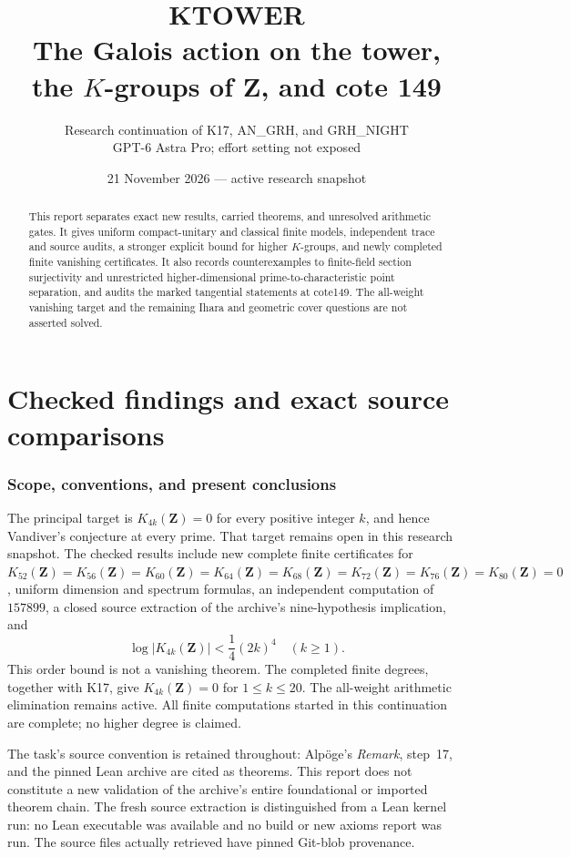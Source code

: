 \documentclass[11pt,a4paper]{article}
\title{KTOWER\\The Galois action on the tower,\\the $K$-groups of $\mathbf Z$, and cote 149}
\author{Research continuation of K17, AN\_GRH, and GRH\_NIGHT\\GPT-6 Astra Pro; effort setting not exposed}
\date{21 November 2026 --- active research snapshot}
\theoremstyle{definition}
\begin{document}
\maketitle
\begin{abstract}
This report separates exact new results, carried theorems, and unresolved
arithmetic gates. It gives uniform compact-unitary and classical finite
models, independent trace and source audits, a stronger explicit bound
for higher $K$-groups, and newly completed finite vanishing certificates.
It also records counterexamples to finite-field section surjectivity
and unrestricted higher-dimensional prime-to-characteristic point
separation, and audits the marked tangential statements at cote149.
The all-weight vanishing target and the remaining Ihara and geometric
cover questions are not asserted solved.
\end{abstract}
\tableofcontents
\clearpage

\part{Checked findings and exact source comparisons}

\section{Scope, conventions, and present conclusions}

The principal target is $K_{4k}(\mathbf Z)=0$ for every positive
integer $k$, and hence Vandiver's conjecture at every prime.
That target remains open in this research snapshot.
The checked results include new complete finite certificates for
$K_{52}(\mathbf Z)=K_{56}(\mathbf Z)=K_{60}(\mathbf Z)=K_{64}(\mathbf Z)=K_{68}(\mathbf Z)=K_{72}(\mathbf Z)=K_{76}(\mathbf Z)=K_{80}(\mathbf Z)=0$, uniform dimension and
spectrum formulas, an independent computation of $157899$, a closed
source extraction of the archive's nine-hypothesis implication, and
\[
 \boxed{\ \log|K_{4k}(\mathbf Z)|<\frac14(2k)^4\quad(k\ge1).\ }
\]
This order bound is not a vanishing theorem. The completed finite
degrees, together with K17, give $K_{4k}(\mathbf Z)=0$ for
$1\le k\le20$. The all-weight arithmetic elimination remains
active. All finite computations started in this continuation are complete;
no higher degree is claimed.

The task's source convention is retained throughout: Alp\"oge's
\emph{Remark}, step~17, and the pinned Lean archive are cited as
theorems. This report does not constitute a new validation of the
archive's entire foundational or imported theorem chain. The fresh
source extraction is distinguished from a Lean kernel run: no Lean
executable was available and no build or new axioms report was run.
The source files actually retrieved have pinned Git-blob provenance.
\end{document}
